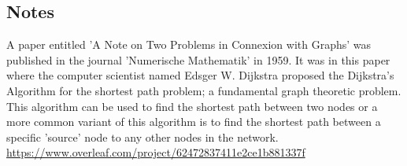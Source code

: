 \fi


\subsection{Notes}

A paper entitled 'A Note on Two Problems in Connexion with Graphs' was published in the journal 'Numerische Mathematik' in 1959. It was in this paper where the computer scientist named Edsger W. Dijkstra proposed the Dijkstra's Algorithm for the shortest path problem; a fundamental graph theoretic problem. This algorithm can be used to find the shortest path between two nodes or a more common variant of this algorithm is to find the shortest path between a specific 'source' node to any other nodes in the network. \href{Thanks Jerrin baby}{https://www.overleaf.com/project/62472837411e2ce1b881337f}
